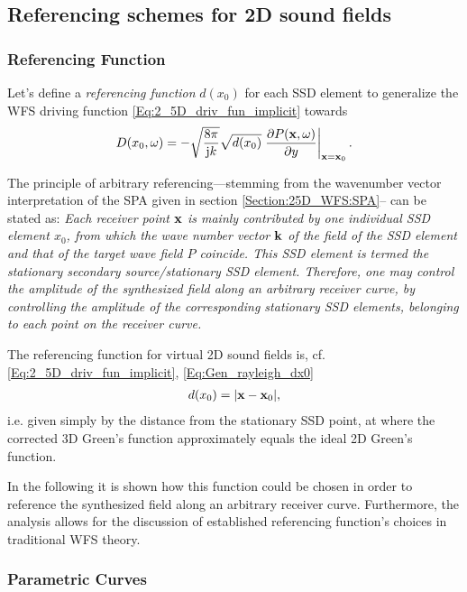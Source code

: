 \subsection{Referencing schemes for 2D sound fields}

\subsubsection{Referencing Function}

Let's define a \emph{referencing function} $d(x_0)$ for each SSD element to generalize the WFS driving function \eqref{Eq:2_5D_driv_fun_implicit} towards
\begin{equation}
D(x_0,\omega) = 
- \sqrt{\frac{8\pi}{\mathrm{j} k}} \sqrt{d(x_0)} \left. \frac{\partial P(\mathbf{x},\omega)}{\partial y}\right|_{\mathbf{x} = \mathbf{x}_0}.
\label{Eq:Gen_rayleigh_dx0}
\end{equation}

The principle of arbitrary referencing---stemming from the wavenumber vector interpretation of the SPA given in section \ref{Section:25D_WFS:SPA}-- can be stated as:
\emph{Each receiver point $\mathbf{x}$ is mainly contributed by one individual SSD element $x_0$, from which the wave number vector ${\bf k}$ of the field of the SSD element and that of the target wave field $P$ coincide. This SSD element is termed the stationary secondary source/stationary SSD element.
Therefore, one may control the amplitude of the synthesized field along an arbitrary receiver curve, by controlling the amplitude of the corresponding stationary SSD elements, belonging to each point on the receiver curve.}

The referencing function for virtual 2D sound fields is, cf. \eqref{Eq:2_5D_driv_fun_implicit}, \eqref{Eq:Gen_rayleigh_dx0}
\begin{align}
d(x_0) = |\mathbf{x}-\mathbf{x}_0|,
\label{dx0_2DSources}
\end{align}
i.e. given simply by the distance from the stationary SSD point, at where the corrected 3D Green's function approximately equals the ideal 2D Green's function.

In the following it is shown how this function could be chosen in order to reference the synthesized field along an arbitrary receiver curve. Furthermore, the analysis allows for the discussion of established referencing function's choices in traditional WFS theory.

\subsubsection{Parametric Curves}

